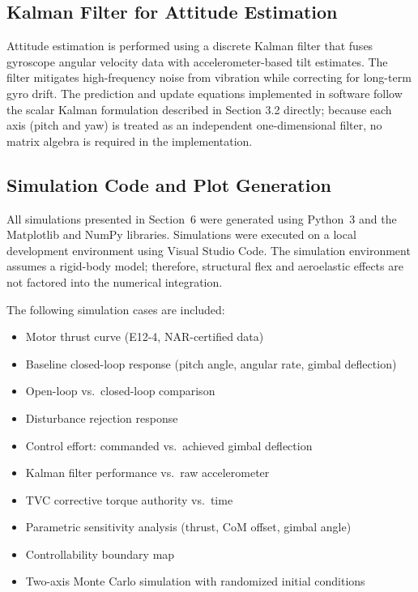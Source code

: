 \subsection{Kalman Filter for Attitude Estimation}
\label{subsec:app_kalman}

Attitude estimation is performed using a discrete Kalman filter that fuses gyroscope angular
velocity data with accelerometer-based tilt estimates. The filter mitigates high-frequency noise
from vibration while correcting for long-term gyro drift. 
The prediction and update equations implemented in software follow the scalar Kalman formulation described in Section 3.2 directly; because each axis (pitch and yaw) is treated as an independent one-dimensional filter, no matrix algebra is required in the implementation.

\subsection{Simulation Code and Plot Generation}
\label{subsec:app_simcode}

All simulations presented in Section~6 were generated using Python~3 and the Matplotlib and NumPy
libraries. Simulations were executed on a local development environment using Visual Studio Code.
The simulation environment assumes a rigid-body model; therefore, structural flex and aeroelastic
effects are not factored into the numerical integration.

The following simulation cases are included:

\begin{itemize}
    \item Motor thrust curve (E12-4, NAR-certified data)
    \item Baseline closed-loop response (pitch angle, angular rate, gimbal deflection)
    \item Open-loop vs.\ closed-loop comparison
    \item Disturbance rejection response
    \item Control effort: commanded vs.\ achieved gimbal deflection
    \item Kalman filter performance vs.\ raw accelerometer
    \item TVC corrective torque authority vs.\ time
    \item Parametric sensitivity analysis (thrust, CoM offset, gimbal angle)
    \item Controllability boundary map
    \item Two-axis Monte Carlo simulation with randomized initial conditions
\end{itemize}

